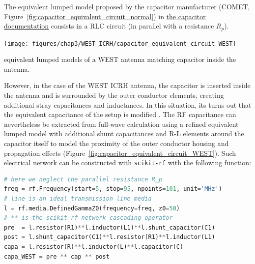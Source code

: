 {The equivalent lumped model proposed by the capacitor manufacturer (COMET, Figure~\ref{fig:capacitor_equivalent_circuit_normal}) in \href{https://www.comet-pct.com/getmedia/fb744f1b-1125-4c91-8af3-e058fa56a3bd/SB-52_Technical_Recommendations_and_General_Instructions_for_Vacuum_Capacitors.aspx}{the capacitor documentation} consists in a RLC circuit (in parallel with a resistance $R_p$). 


\begin{marginfigure}
	\centering
	\texttt{[image: figures/chap3/WEST\_ICRH/capacitor\_equivalent\_circuit\_WEST]}
	\caption{equivalent lumped models of a WEST antenna matching capacitor inside the antenna.}
	\label{fig:capacitor_equivalent_circuit_WEST}	  
\end{marginfigure}

However, in the case of the WEST ICRH antenna, the capacitor is inserted inside the antenna and is surrounded by the outer conductor elements, creating additional stray capacitances and inductances. In this situation, its turns out that the equivalent capacitance of the setup is modified \cite{helou2018}. The RF capacitance can nevertheless be extracted from full-wave calculation using a refined equivalent lumped model with additional shunt capacitances and R-L elements around the capacitor itself to model the proximity of the outer conductor housing and propagation effects (Figure~\ref{fig:capacitor_equivalent_circuit_WEST}). Such electrical network can be constructed with \texttt{scikit-rf} with the following function:

\begin{lstlisting}[language=Python]
# here we neglect the parallel resistance R_p
freq = rf.Frequency(start=5, stop=95, npoints=101, unit='MHz')
# line is an ideal transmission line media
l = rf.media.DefinedGammaZ0(frequency=freq, z0=50)  
# ** is the scikit-rf network cascading operator
pre  = l.resistor(R1)**l.inductor(L1)**l.shunt_capacitor(C1)
post = l.shunt_capacitor(C1)**l.resistor(R1)**l.inductor(L1)
capa = l.resistor(R)**l.inductor(L)**l.capacitor(C)
capa_WEST = pre ** cap ** post  
\end{lstlisting}

}
